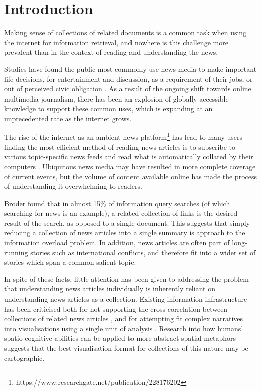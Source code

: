 
\section{Introduction}

Making sense of collections of related documents is a common task when using the internet for information retrieval, and nowhere is this challenge more prevalent than in the context of reading and understanding the news.

Studies have found the public most commonly use news media to make important life decisions, for entertainment and discussion, as a requirement of their jobs, or out of perceived civic obligation \citep{InformationCartography, UnderstandingTheParticipatoryNewsConsumer}. As a result of the ongoing shift towards online multimedia journalism, 
there has been an explosion of globally accessible knowledge to support these common uses, which is expanding at an unprecedented rate as the internet grows.

The rise of the internet as an ambient news platform\footnote{https://www.researchgate.net/publication/228176202} has lead to many users finding the most efficient method of reading news articles is to subscribe to various topic-specific news feeds and read what is automatically collated by their computers \citep{nReader}. Ubiquitous news media may have resulted in more complete coverage of current events, but the volume of content available online has made the process of understanding it overwhelming to readers.

Broder\citep{ATaxonomyofWebSearch} found that in almost 15\% of information query searches (of which searching for news is an example), a related collection of links is the desired result of the search, as opposed to a single document. This suggests that simply reducing a collection of news articles into a single summary is approach to the information overload problem. In addition, news articles are often part of long-running stories \citep{ExploringLongRunningNewsStoriesUsingWikipedia} such as international conflicts, and therefore fit into a wider set of stories which span a common salient topic.

In spite of these facts, little attention has been given to addressing the problem that understanding news articles individually is inherently reliant on understanding news articles as a collection. Existing information infrastructure has been criticised both for not supporting the cross-correlation between collections of related news articles \citep{GalaxyOfNews}, and for attempting fit complex narratives into visualisations using a single unit of analysis \citep{InformationCartography}. Research into how humans' spatio-cognitive abilities can be applied to more abstract spatial metaphors \citep{FromMetaphorToMethod} suggests that the best visualisation format for collections of this nature may be cartographic.


